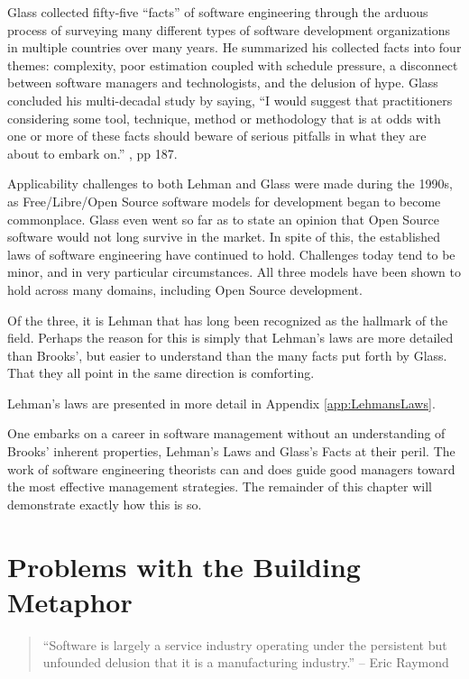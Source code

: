 Glass collected fifty-five ``facts'' of software engineering through the arduous process of surveying many different types of software development organizations in multiple countries over many years. He summarized his collected facts into four themes: complexity, poor estimation coupled with schedule pressure, a disconnect between software managers and technologists, and the delusion of hype. Glass concluded his multi-decadal study by saying, ``I would suggest that practitioners considering some tool, technique, method or methodology that is at odds with one or more of these facts should beware of serious pitfalls in what they are about to embark on.'' \cite{Glass-2003}, pp 187.

Applicability challenges to both Lehman and Glass were made during the 1990s, as Free/Libre/Open Source software models for development began to become commonplace. Glass even went so far as to state an opinion that Open Source software would not long survive in the market. In spite of this, the established laws of software engineering have continued to hold. Challenges today tend to be minor, and in very particular circumstances. All three models have been shown to hold across many domains, including Open Source development.

Of the three, it is Lehman that has long been recognized as the hallmark of the field. Perhaps the reason for this is simply that Lehman's laws are more detailed than Brooks', but easier to understand than the many facts put forth by Glass. That they all point in the same direction is comforting.

Lehman's laws are presented in more detail in Appendix \ref{app:LehmansLaws}.

One embarks on a career in software management without an understanding of Brooks' inherent properties, Lehman's Laws and Glass's Facts at their peril. The work of software engineering theorists can and does guide good managers toward the most effective management strategies. The remainder of this chapter will demonstrate exactly how this is so.


\section{Problems with the Building Metaphor}

\begin{quotation}
``Software is largely a service industry operating under the persistent but unfounded delusion that it is a manufacturing industry.'' -- Eric Raymond
\end{quotation}

